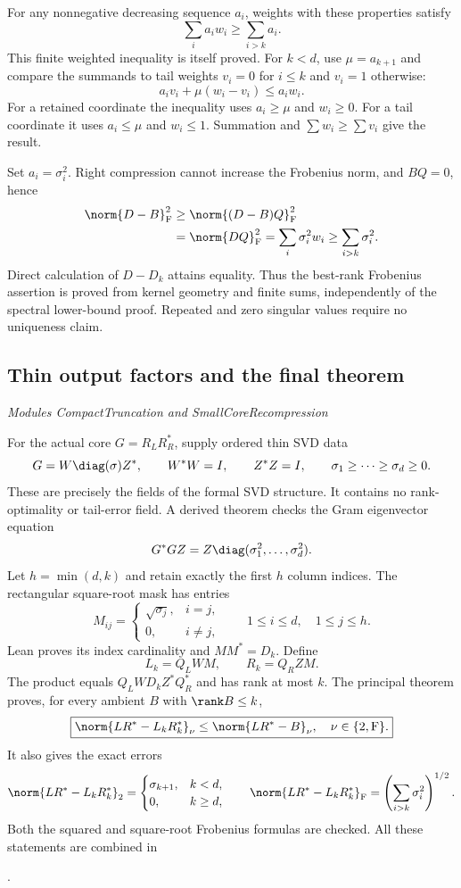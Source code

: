 For any nonnegative decreasing sequence $a_i$, weights with these properties satisfy
\[
\sum_i a_iw_i\geq\sum_{i>k}a_i.
\]
This finite weighted inequality is itself proved. For $k<d$, use $\mu=a_{k+1}$ and compare the summands to tail weights $v_i=0$ for $i\leq k$ and $v_i=1$ otherwise:
\[
a_iv_i+\mu(w_i-v_i)\leq a_iw_i.
\]
For a retained coordinate the inequality uses $a_i\geq\mu$ and $w_i\geq0$. For a tail coordinate it uses $a_i\leq\mu$ and $w_i\leq1$. Summation and $\sum w_i\geq\sum v_i$ give the result.

Set $a_i=\sigma_i^2$. Right compression cannot increase the Frobenius norm, and $BQ=0$, hence
\[
\begin{aligned}
\norm{D-B}_{\mathrm F}^{2}
&\geq\norm{(D-B)Q}_{\mathrm F}^{2}\\
&=\norm{DQ}_{\mathrm F}^{2}
=\sum_i\sigma_i^2w_i
\geq\sum_{i>k}\sigma_i^2.
\end{aligned}
\]
Direct calculation of $D-D_k$ attains equality. Thus the best-rank Frobenius assertion is proved from kernel geometry and finite sums, independently of the spectral lower-bound proof. Repeated and zero singular values require no uniqueness claim.



\subsection{Thin output factors and the final theorem}\label{supp6:subsection:005}\textit{Modules CompactTruncation and SmallCoreRecompression}\par
For the actual core $G=R_LR_R^*$, supply ordered thin SVD data
\[
G=W\diag(\sigma)Z^*,\qquad W^*W=I,
\qquad Z^*Z=I,\qquad \sigma_1\geq\cdots\geq\sigma_d\geq0.
\]
These are precisely the fields of the formal SVD structure. It contains no rank-optimality or tail-error field. A derived theorem checks the Gram eigenvector equation
\[
G^*GZ=Z\diag(\sigma_1^2,\ldots,\sigma_d^2).
\]
Let $h=\min(d,k)$ and retain exactly the first $h$ column indices. The rectangular square-root mask has entries
\[
M_{ij}=\begin{cases}\sqrt{\sigma_j},&i=j,\\0,&i\ne j,\end{cases}
\qquad 1\leq i\leq d,\quad 1\leq j\leq h.
\]
Lean proves its index cardinality and $MM^*=D_k$. Define
\[
\boxed{L_k=Q_LWM,\qquad R_k=Q_RZM.}
\]
The product equals $Q_LWD_kZ^*Q_R^*$ and has rank at most $k$. The principal theorem proves, for every ambient $B$ with $\rank B\leq k$,
\[
\boxed{\norm{LR^*-L_kR_k^*}_\nu\leq\norm{LR^*-B}_\nu,
\quad\nu\in\{2,\mathrm F\}.}
\]
It also gives the exact errors
\[
\norm{LR^*-L_kR_k^*}_2=
\begin{cases}\sigma_{k+1},&k<d,\\0,&k\geq d,\end{cases}
\qquad
\norm{LR^*-L_kR_k^*}_{\mathrm F}
=\left(\sum_{i>k}\sigma_i^2\right)^{1/2}.
\]
Both the squared and square-root Frobenius formulas are checked. All these statements are combined in\par
{}.

